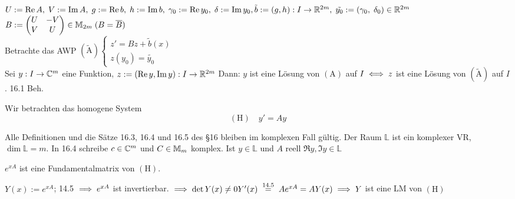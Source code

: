 \documentclass[a4paper,twoside,DIV15,BCOR12mm]{scrbook}
\begin{document}
\begin{beweis}
$U:=\mathop{\rm Re}\nolimits A,\; V:=\mathop{\rm Im}\nolimits A,\; g:=\mathop{\rm Re}\nolimits b,\; h:= \mathop{\rm Im}\nolimits b,\; \gamma_0:=\mathop{\rm Re}\nolimits y_0,\; \delta:=\mathop{\rm Im}\nolimits y_0,\; \\ \tilde{b}:=(g,h): I \rightarrow \mathbb{R}^{2m},\; \tilde{y_0}:=(\gamma_0,\; \delta_0) \in \mathbb{R}^{2m}$ \\
$B:=\begin{pmatrix}U & -V \\ V & U \end{pmatrix} \in \mathbb{M}_{2m} \; (B=\overline{B})$ \\
Betrachte das AWP $(\tilde{\text{A}}) \begin{cases}z' = Bz + \tilde{b}(x) \\ z(y_0) = \tilde{y_0} \end{cases}$ \\
Sei $y: I \rightarrow \mathbb{C}^m$ eine Funktion, $z:=(\mathop{\rm Re}\nolimits y, \mathop{\rm Im}\nolimits y): I \rightarrow \mathbb{R}^{2m}$ Dann: $y$ ist eine Lösung von $(\text{A})$ auf $I \iff z$ ist eine Lösung von $(\tilde{\text{A}})$ auf $I$. 16.1 \folgt Beh.
\end{beweis}  

Wir betrachten das homogene System
\[(\text{H}) \quad y' = Ay\]

\begin{folgerung}
Alle Definitionen und die Sätze 16.3, 16.4 und 16.5 des §16 bleiben im komplexen Fall gültig. Der Raum $\mathbb{L}$ ist ein komplexer VR, $\dim \mathbb{L} = m$. In 16.4 schreibe $c \in \mathbb{C}^m$ und $C \in \mathbb{M}_m$ komplex. Ist $y \in \mathbb{L}$ und $A$ reell  $\Re y, \Im y \in \mathbb{L}$ 
\end{folgerung}

\begin{satz}
$e^{xA}$ ist eine Fundamentalmatrix von $(\text{H})$.
\end{satz}

\begin{beweis}
$Y(x):=e^{xA}$; 14.5 $\implies e^{xA}$ ist invertierbar. $\folgt \det Y(x) \neq 0 \\
Y'(x) \gleichnach{14.5} Ae^{xA} = AY(x) \folgt Y$ ist eine LM von $(\text{H})$
\end{beweis}
\end{document}
